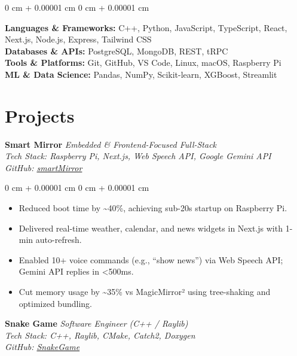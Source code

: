 \documentclass[11pt, a4paper]{article}
\newenvironment{highlights}{
    \begin{itemize}[
        topsep=0.10 cm,
        parsep=0.10 cm,
        partopsep=0pt,
        itemsep=0pt,
        leftmargin=0 cm + 10pt
    ]
}{
    \end{itemize}
} %
\newenvironment{onecolentry}{
    \begin{adjustwidth}{
        0 cm + 0.00001 cm
    }{
        0 cm + 0.00001 cm
    }
}{
    \end{adjustwidth}
} %
\begin{document}
\begin{onecolentry}
    \textbf{Languages \& Frameworks:} C++, Python, JavaScript, TypeScript, React, Next.js, Node.js, Express, Tailwind CSS \\
    \textbf{Databases \& APIs:} PostgreSQL, MongoDB, REST, tRPC \\
    \textbf{Tools \& Platforms:} Git, GitHub, VS Code, Linux, macOS, Raspberry Pi \\
    \textbf{ML \& Data Science:} Pandas, NumPy, Scikit-learn, XGBoost, Streamlit
\end{onecolentry}


\vspace{0.1cm}
\section{Projects}

\textbf{Smart Mirror} \hfill \textit{Embedded \& Frontend-Focused Full-Stack} \\
\textit{Tech Stack: Raspberry Pi, Next.js, Web Speech API, Google Gemini API} \\
\textit{GitHub: \href{https://github.com/dhruvicious/smartMirror}{smartMirror}}

\vspace{0.1cm}
\begin{onecolentry}
    \begin{highlights}
        \item Reduced boot time by \textasciitilde40\%, achieving sub-20s startup on Raspberry Pi.
        \item Delivered real-time weather, calendar, and news widgets in Next.js with 1-min auto-refresh.
        \item Enabled 10+ voice commands (e.g., “show news”) via Web Speech API; Gemini API replies in <500ms.
        \item Cut memory usage by \textasciitilde35\% vs MagicMirror² using tree-shaking and optimized bundling.
    \end{highlights}
\end{onecolentry}

\vspace{0.3cm}
\textbf{Snake Game} \hfill \textit{Software Engineer (C++ / Raylib)} \\
\textit{Tech Stack: C++, Raylib, CMake, Catch2, Doxygen} \\
\textit{GitHub: \href{https://github.com/dhruvicious/SnakeGame}{SnakeGame}}
\end{document}
